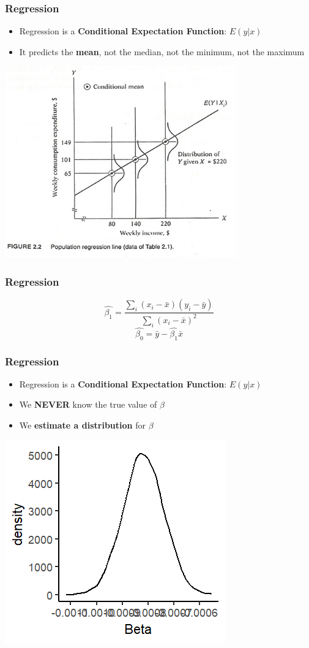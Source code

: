 \documentclass[xcolor=x11names,compress]{beamer}\usepackage[]{graphicx}\usepackage[]{color}
\makeatletter
\def\maxwidth{ %
  \ifdim\Gin@nat@width>\linewidth
    \linewidth
  \else
    \Gin@nat@width
  \fi
}
\newenvironment{knitrout}{}{} %
\renewcommand{\(}{\begin{columns}}
\renewcommand{\)}{\end{columns}}
\newcommand{\<}[1]{\begin{column}{#1}}
\renewcommand{\>}{\end{column}}
\makeatother
\begin{document}
\begin{frame}
\frametitle{Regression}
\begin{itemize}
\item Regression is a \textbf{Conditional Expectation Function}: $E(y|x)$
\pause
\item It predicts the \textbf{mean}, not the median, not the minimum, not the maximum
\end{itemize}
\includegraphics[width=0.75\textwidth]{CEF.jpg}
\end{frame}

\begin{frame}
\frametitle{Regression}
$$\hat{\beta_1}=\frac{\sum_i (x_i - \bar{x})(y_i - \bar{y})}{\sum_i (x_i - \bar{x})^2}$$
$$\hat{\beta_0}=\bar{y} - \hat{\beta_1} \bar{x}$$
\end{frame}

\begin{frame}
\frametitle{Regression}
\begin{itemize}
\item Regression is a \textbf{Conditional Expectation Function}: $E(y|x)$
\pause
\item We \textbf{NEVER} know the true value of $\beta$
\pause
\item We \textbf{estimate a distribution} for $\beta$
\end{itemize}
\begin{knitrout}
\color{fgcolor}
\includegraphics[width=\maxwidth]{figure/beta_dist-1} 

\end{knitrout}
\end{frame}
\end{document}
